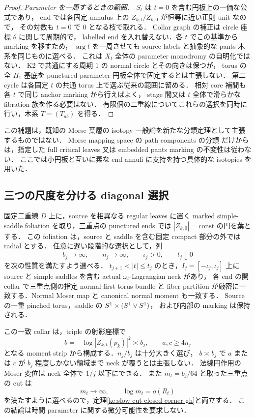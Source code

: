 \begin{proof}
\emph{Parameter を一周するときの範囲．}
$S_t$ は $t=0$ を含む円板上の一価な公式であり，
end では各固定 annulus 上の $Z_{k,t}/Z_{k,0}$ が恒等に近い正則 unit なので，
その対数も $t=0$ で $0$ となる枝で取れる．
Collar graph の補正は circle 座標 $\theta$ に関して周期的で，
labelled end を入れ替えない．各 $t$ でこの基準から marking を移すため，
$\arg t$ を一周させても source labels と抽象的な pants 木系を同じものに選べる．
これは $X_t$ 全体の parameter monodromy の自明化ではない．
K2 で共通にする周期 $1$ の normal circle とその向きは保つが，
torus の全 $H_1$ 基底を punctured parameter 円板全体で固定するとは主張しない．
第二 cycle は各固定 $t$ の共通 torus 上で選ぶ従来の範囲に留める．
相対 core 補間も各 $t$ で同じ anchor marking から行えばよく，
stage 間又は $t$ 全体で滑らかな fibration 族を作る必要はない．
有限個の二重線についてこれらの選択を同時に行い，木系 $T=(T_{ab})$ を得る．
\end{proof}

この補題は，既知の Morse 葉層の isotopy 一般論を新たな分類定理として主張するものではない．
Morse mapping space の path components の分類
\cite[Main Theorem]{Maksymenko}だけからは，指定した full critical leaves 又は
embedded pants marking の不変性は従わない．
ここでは小円板と互いに素な end annuli に支持を持つ具体的な isotopies を用いた．

\subsection{三つの尺度を分ける diagonal 選択}

\begin{theorem}
\label{ke:neck-corner-diagonal-matching}
固定二重線 $D$ 上に，source を相異なる regular leaves に置く
marked simple-saddle foliation を取り，三重点の punctured ends では
$|Z_{k,0}|=\mathrm{const}$ の円を葉とする．
この foliation は，source と saddle を含む固定 compact 部分の外では radial とする．
任意に遅い段階的な選択として，列
\[
 b_j\longrightarrow\infty,\qquad
 n_j\longrightarrow\infty,\qquad
 \iota_j>0,\qquad t_j\downarrow0
\]
を次の性質を満たすよう選べる．
$t_{j+1}<|t|\le t_j$ のとき，$I_j=[-\iota_j,\iota_j]$ 上に
source と simple saddles を含む actual $\omega_t$-Lagrangian neck があり，
各 end の開 collar で三重点側の指定 normal-first torus bundle と
fiber partition が厳密に一致する．Normal Moser map と canonical normal moment も一致する．
Source の一重 pinched torus，saddle の $S^1\times(S^1\vee S^1)$，
および内部の marking は保持される．

この一致 collar は，triple の射影座標で
\[
 b=-\log|Z_{k,t}(p_k)|^2\asymp b_j,
 \qquad a,c\ge4n_j
\]
となる moment strip から構成する．$n_j/b_j$ は十分大きく選び，
$b\asymp b_j$ で $a$ または $c$ が $b_j$ 程度しかない領域まで
neck が覆うとは主張しない．
法線円作用の Moser 変位は neck 全体で $1/j$ 以下にできる．
また $m_t=b_j/64$ と取った三重点の cut は
\[
 m_t\to\infty,\qquad \log m_t=o(R_t)
\]
を満たすように選べるので，定理\ref{ke:slow-cut-closed-corner-gh}と両立する．
この結論は時間 parameter に関する微分可能性を要求しない．
\end{theorem}

